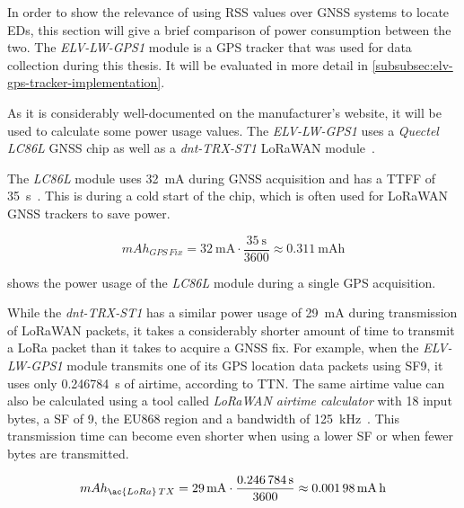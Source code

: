 In order to show the relevance of using \ac{RSS} values over \ac{GNSS} systems to locate \aclp{ED}, this section will give a brief comparison of power consumption between the two.
The \emph{ELV-LW-GPS1} module is a \ac{GPS} tracker that was used for data collection during this thesis.
It will be evaluated in more detail in \cref{subsubsec:elv-gps-tracker-implementation}.

As it is considerably well-documented on the manufacturer's website, it will be used to calculate some power usage values.
The \emph{ELV-LW-GPS1} uses a \emph{Quectel LC86L} \ac{GNSS} chip as well as a \emph{dnt-TRX-ST1} \ac{LoRaWAN} module~\cite{elv_elektronik_ag_elv_2023}.

The \emph{LC86L} module uses \SI{32}{\milli\ampere} during \ac{GNSS} acquisition and has a \ac{TTFF} of \SI{35}{\second}~\cite{quectel_gnss_nodate}.
This is during a cold start of the chip, which is often used for \ac{LoRaWAN} \ac{GNSS} trackers to save power.

\begin{equation}\label{eq:LC86L-fix-consumption}
    mAh_{GPS\,Fix} = \SI{32}{\milli\ampere} \cdot \frac{\SI{35}{\second}}{3600} \approx \SI{0.311}{\milli\ampere\hour}
\end{equation}

 shows the power usage of the \emph{LC86L} module during a single \ac{GPS} acquisition.

While the \emph{dnt-TRX-ST1} has a similar power usage of \SI{29}{\milli\ampere} during transmission of \ac{LoRaWAN} packets, it takes a considerably shorter amount of time to transmit a \ac{LoRa} packet than it takes to acquire a \ac{GNSS} fix.
For example, when the \emph{ELV-LW-GPS1} module transmits one of its \ac{GPS} location data packets using \ac{SF}9, it uses only \SI{0.246784}{\second} of airtime, according to \ac{TTN}.
The same airtime value can also be calculated using a tool called \emph{\ac{LoRaWAN} airtime calculator} with 18 input bytes, a \ac{SF} of 9, the EU868 region and a bandwidth of \SI{125}{\kilo\hertz}~\cite{the_things_network_lorawan_nodate}.
This transmission time can become even shorter when using a lower \ac{SF} or when fewer bytes are transmitted.

\begin{equation}\label{eq:dnt-TRX-ST1-tx-consumption}
    mAh_{\ac{LoRa}\,TX} = \SI{29}{\milli\ampere} \cdot \frac{\SI{0.246784}{\second}}{3600} \approx \SI{0.00198}{\milli\ampere\hour}
\end{equation}

